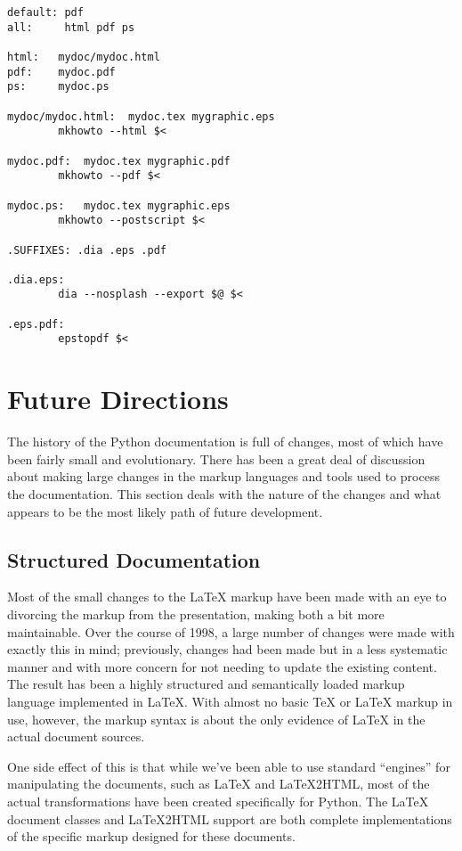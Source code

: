 \documentclass{howto}
\begin{document}
\begin{verbatim}
default: pdf
all:     html pdf ps

html:   mydoc/mydoc.html
pdf:    mydoc.pdf
ps:     mydoc.ps

mydoc/mydoc.html:  mydoc.tex mygraphic.eps
        mkhowto --html $<

mydoc.pdf:  mydoc.tex mygraphic.pdf
        mkhowto --pdf $<

mydoc.ps:   mydoc.tex mygraphic.eps
        mkhowto --postscript $<

.SUFFIXES: .dia .eps .pdf

.dia.eps:
        dia --nosplash --export $@ $<

.eps.pdf:
        epstopdf $<
\end{verbatim} %


\section{Future Directions \label{futures}}

  The history of the Python documentation is full of changes, most of
  which have been fairly small and evolutionary.  There has been a
  great deal of discussion about making large changes in the markup
  languages and tools used to process the documentation.  This section
  deals with the nature of the changes and what appears to be the most
  likely path of future development.

  \subsection{Structured Documentation \label{structured}}

    Most of the small changes to the \LaTeX{} markup have been made
    with an eye to divorcing the markup from the presentation, making
    both a bit more maintainable.  Over the course of 1998, a large
    number of changes were made with exactly this in mind; previously,
    changes had been made but in a less systematic manner and with
    more concern for not needing to update the existing content.  The
    result has been a highly structured and semantically loaded markup
    language implemented in \LaTeX.  With almost no basic \TeX{} or
    \LaTeX{} markup in use, however, the markup syntax is about the
    only evidence of \LaTeX{} in the actual document sources.

    One side effect of this is that while we've been able to use
    standard ``engines'' for manipulating the documents, such as
    \LaTeX{} and \LaTeX2HTML, most of the actual transformations have
    been created specifically for Python.  The \LaTeX{} document
    classes and \LaTeX2HTML support are both complete implementations
    of the specific markup designed for these documents.
\end{document}
